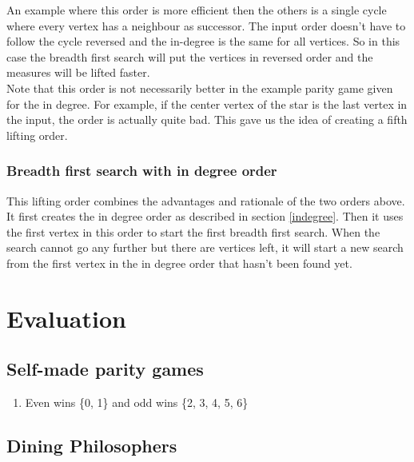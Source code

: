 \documentclass[10pt,a4paper]{article}
\begin{document}
An example where this order is more efficient then the others is a single cycle where every vertex has a neighbour as successor. The input order doesn't have to follow the cycle reversed and the in-degree is the same for all vertices. So in this case the breadth first search will put the vertices in reversed order and the measures will be lifted faster.\\
Note that this order is not necessarily better in the example parity game given for the in degree. For example, if the center vertex of the star is the last vertex in the input, the order is actually quite bad. This gave us the idea of creating a fifth lifting order.

\subsubsection{Breadth first search with in degree order}
This lifting order combines the advantages and rationale of the two orders above. It first creates the in degree order as described in section \ref{indegree}. Then it uses the first vertex in this order to start the first breadth first search. When the search cannot go any further but there are vertices left, it will start a new search from the first vertex in the in degree order that hasn't been found yet.

\section{Evaluation}\label{eval}

\subsection{Self-made parity games}

\begin{enumerate}[Game01]
	\item Even wins \{0, 1\} and odd wins \{2, 3, 4, 5, 6\}
\end{enumerate}

\subsection{Dining Philosophers}

\end{document}
